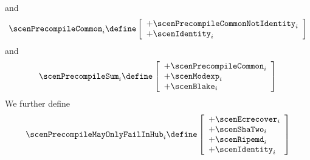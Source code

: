 and
\[
	\scenPrecompileCommon _{i}
	\define
	\left[ \begin{array}{l}
		+ \scenPrecompileCommonNotIdentity _{i} \\
		+ \scenIdentity                    _{i} \\
	\end{array} \right]
\]
and
\[
	\scenPrecompileSum_{i}
	\define
	\left[ \begin{array}{l}
		+ \scenPrecompileCommon _{i} \\
		+ \scenModexp           _{i} \\
		+ \scenBlake            _{i} \\
	\end{array} \right]
\]
We further define
\[
	\scenPrecompileMayOnlyFailInHub _{i}
	\define
	\left[ \begin{array}{l}
		+ \scenEcrecover       _{i} \\
		+ \scenShaTwo          _{i} \\
		+ \scenRipemd          _{i} \\
		+ \scenIdentity        _{i} \\
	\end{array} \right]
\]
